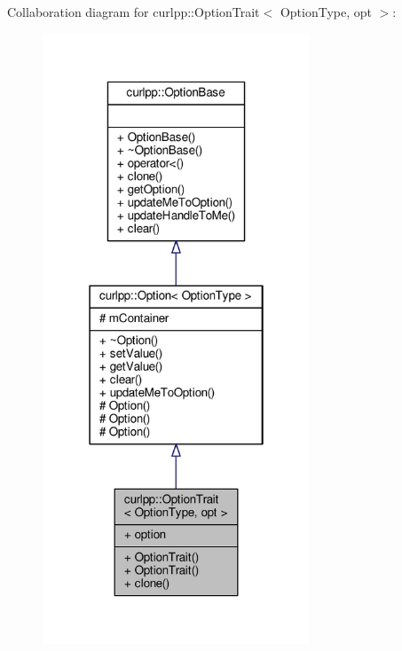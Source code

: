 Collaboration diagram for curlpp\-:\-:Option\-Trait$<$ Option\-Type, opt $>$\-:\nopagebreak
\begin{figure}[H]
\begin{center}
\leavevmode
\includegraphics[width=226pt]{classcurlpp_1_1OptionTrait__coll__graph}
\end{center}
\end{figure}
